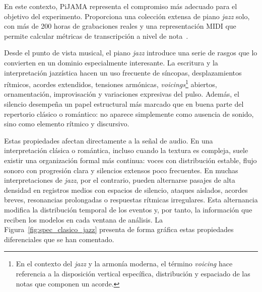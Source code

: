 \documentclass[11pt,spanish,listoffigures,listoftables]{tfgetsinf}
\begin{document}
En este contexto, PiJAMA representa el compromiso más adecuado para el objetivo del
experimento. Proporciona una colección extensa
de piano \textit{jazz} solo, con más de 200 horas de grabaciones reales y una representación
MIDI que permite calcular métricas de transcripción a nivel de nota~\cite{edwards2023pijama}.


Desde el punto de vista musical, el piano \textit{jazz} introduce una serie de rasgos que lo
convierten en un dominio especialmente interesante. La escritura y la interpretación
jazzística hacen un uso frecuente de síncopas, desplazamientos rítmicos, acordes
extendidos, tensiones armónicas, \textit{voicings}\footnote{En el contexto del \textit{jazz} y
la armonía moderna, el término \textit{voicing} hace referencia a la disposición vertical específica,
distribución y espaciado de las notas que componen un acorde.}
abiertos, ornamentación, improvisación y
variaciones expresivas del pulso. Además, el silencio desempeña un papel estructural
más marcado que en buena parte del repertorio clásico o romántico: no aparece
simplemente como ausencia de sonido, sino como elemento rítmico y discursivo.

Estas propiedades afectan directamente a la señal de audio. En una interpretación
clásica o romántica, incluso cuando la textura es compleja, suele existir una organización
formal más continua: voces con distribución estable, flujo
sonoro con progresión clara y silencios extensos poco frecuentes.
En muchas interpretaciones de \textit{jazz}, por el contrario, pueden alternarse pasajes de alta
densidad en registros medios con espacios de silencio, ataques aislados, acordes breves,
resonancias prolongadas o respuestas rítmicas irregulares. Esta alternancia modifica
la distribución temporal de los eventos y, por tanto, la información que reciben los
modelos en cada ventana de análisis. La Figura~\ref{fig:spec_clasico_jazz} presenta de forma gráfica estas propiedades
diferenciales que se han comentado.
\end{document}
